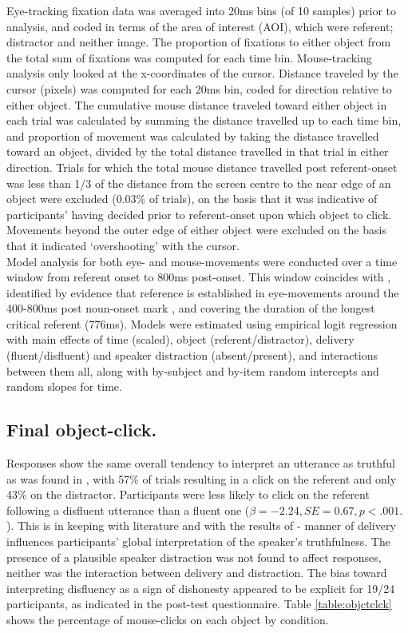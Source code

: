 \documentclass[man]{apa6}
\begin{document}
Eye-tracking fixation data was averaged into 20ms bins (of 10 samples) prior to analysis, and coded in terms of the area of interest (AOI), which were referent; distractor and neither image. 
The proportion of fixations to either object from the total sum of fixations was computed for each time bin. 
Mouse-tracking analysis only looked at the x-coordinates of the cursor. Distance traveled by the cursor (pixels) was computed for each 20ms bin, coded for direction relative to either object. 
The cumulative mouse distance traveled toward either object in each trial was calculated by summing the distance travelled up to each time bin, and proportion of movement was calculated by taking the distance travelled toward an object, divided by the total distance travelled in that trial in either direction. 
Trials for which the total mouse distance travelled post referent-onset was less than 1/3 of the distance from the screen centre to the near edge of an object were excluded (0.03\% of trials), on the basis that it was indicative of participants' having decided prior to referent-onset upon which object to click. 
Movements beyond the outer edge of either object were excluded on the basis that it indicated `overshooting' with the cursor.\\

Model analysis for both eye- and mouse-movements were conducted over a time window from referent onset to 800ms post-onset. 
This window coincides with \citet{Loy2016}, identified by evidence that reference is established in eye-movements around the 400-800ms post noun-onset mark \citep{Eberhard1995}, and covering the duration of the longest critical referent (776ms). 
Models were estimated using empirical logit regression \citep{Barr2008} with main effects of time (scaled), object (referent/distractor), delivery (fluent/disfluent) and speaker distraction (absent/present), and interactions between them all, along with by-subject and by-item random intercepts and random slopes for time. \\

\subsection{Final object-click.}
Responses show the same overall tendency to interpret an utterance as truthful as was found in \citet{Loy2016}, with 57\% of trials resulting in a click on the referent and only 43\% on the distractor. 
Participants were less likely to click on the referent following a disfluent utterance than a fluent one ($\beta = -2.24,SE = 0.67,p<.001.$). 
This is in keeping with literature \citep{Brennan1995, Swerts2005} and with the results of \citet{Loy2016} - manner of delivery influences participants' global interpretation of the speaker's truthfulness. 
The presence of a plausible speaker distraction was not found to affect responses, neither was the interaction between delivery and distraction. 
The bias toward interpreting disfluency as a sign of dishonesty appeared to be explicit for 19/24 participants, as indicated in the post-test questionnaire. 
Table \ref{table:objctclck} shows the percentage of mouse-clicks on each object by condition.\\
\end{document}
